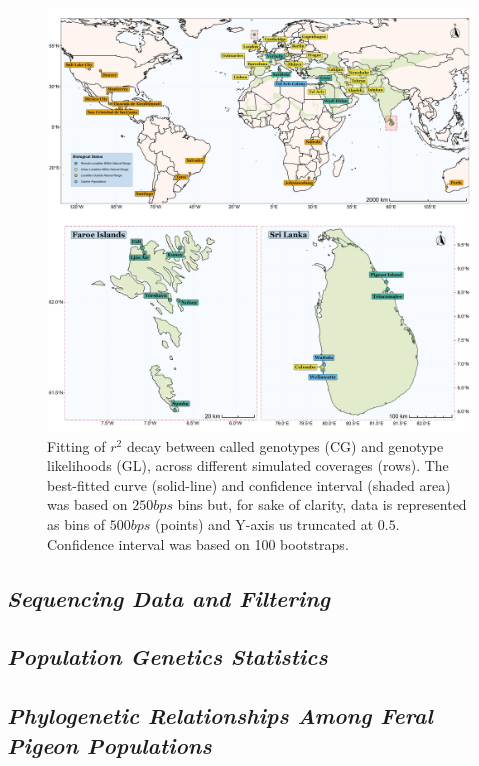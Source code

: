 \documentclass[a4paper]{article}
\begin{document}
\begin{figure}
\centering
\includegraphics[scale=0.35]{../FPGP--Analyses/FPGP--Map/FPGP--Map.pdf}
\caption{Fitting of $r^2$ decay between called genotypes (CG) and genotype likelihoods (GL), across different simulated coverages (rows). The best-fitted curve (solid-line) and confidence interval (shaded area) was based on $250 bps$ bins but, for sake of clarity, data is represented as bins of $500 bps$ (points) and Y-axis us truncated at $0.5$. Confidence interval was based on 100 bootstraps.}
\label{MainText:FPGP--Map}
\end{figure}

\subsection{\textit{Sequencing Data and Filtering}}

\subsection{\textit{Population Genetics Statistics}}

\subsection{\textit{Phylogenetic Relationships Among Feral Pigeon Populations}}
\end{document}
